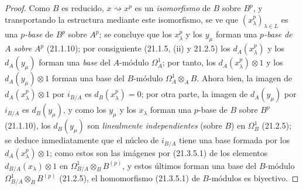 \begin{proof}

Como $B$ es reducido, $x\rightsquigarrow x^p$ es un \emph{isomorfismo} de $B$
sobre $B^p$, y transportando la estructura mediante este isomorfismo, se ve
que $(x_\lambda^p)_{\lambda\in L}$ es una \emph{$p$-base} de
$B^p$ sobre $A^p$; se concluye que los $x_\lambda^p$ y los $y_\mu$ forman
una \emph{$p$-base de} $A$ \emph{sobre} $A^p$ (21.1.10); por consiguiente (21.1.5, (ii) y
21.2.5) los $d_A(x_\lambda^p)$ y los $d_A(y_\mu)$ forman una \emph{base} del $A$-módulo
$\Omega^1_A$; por tanto, los $d_A(x_\lambda^p)\otimes1$ y los $d_A(y_\mu)\otimes1$
forman una base del $B$-módulo $\Omega^1_A\otimes_A B$. Ahora bien, la imagen de $d_A(x_\lambda^p)\otimes1$ por
$i_{B/A}$ es $d_B(x_\lambda^p)=0$; por otra parte, la imagen de $d_A(y_\mu)$
por $i_{B/A}$
 es $d_B(y_\mu)$, y como los $y_\mu$ y los $x_\lambda$
forman una $p$-base de $B$ sobre $B^p$ (21.1.10), los $d_B(y_\mu)$ son
\emph{linealmente independientes} (sobre $B$) en $\Omega^1_B$ (21.2.5); se deduce inmediatamente
que el núcleo de $i_{B/A}$ tiene una base formada por
los $d_A(x_\lambda^p)\otimes1$; como estos son las imágenes por (21.3.5.1) de
los elementos $d_{B/A}(x_\lambda)\otimes1$ en $\Omega^1_{B/A}\otimes_B B^{(p)}$, y estos últimos
forman una base del $B$-módulo $\Omega^1_{B/A}\otimes_B B^{(p)}$ (21.2.5), el
homomorfismo (21.3.5.1) de $B$-módulos es biyectivo.
\end{proof}

